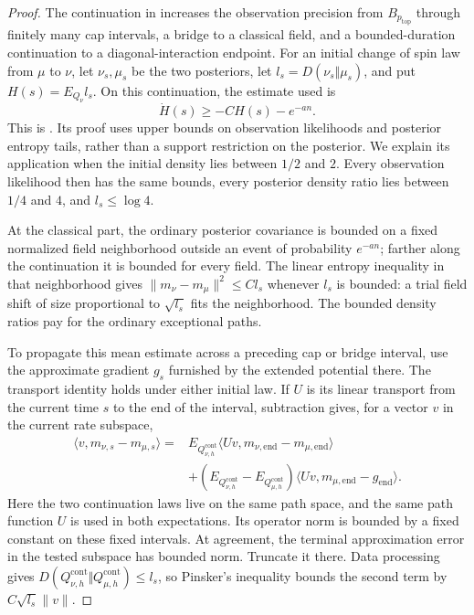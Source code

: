 \begin{proof}
The continuation in \cite[Section~19.4]{CM} increases the observation
precision from $B_{p_{\mathrm{top}}}$ through finitely many cap intervals,
a bridge to a classical field, and a bounded-duration continuation to
a diagonal-interaction endpoint. For an initial change of spin law from
$\mu$ to $\nu$, let $\nu_s,\mu_s$ be the two posteriors, let
$l_s=D(\nu_s\Vert\mu_s)$, and put
$H(s)=E_{Q_\nu}l_s$. On this continuation, the estimate used is
\begin{equation}\label{eq:variance-entropy-ode}
 \dot H(s)\ge-CH(s)-e^{-a n}.
\end{equation}
This is \cite[Equation~(19.17)]{CM}. Its proof uses upper bounds on
observation likelihoods and posterior entropy tails, rather than a
support restriction on the posterior. We explain its application when
the initial density lies between $1/2$ and $2$. Every observation likelihood
then has the same bounds, every posterior density ratio lies between
$1/4$ and $4$, and $l_s\le\log4$.

At the classical part, the ordinary posterior covariance is bounded on
a fixed normalized field neighborhood outside an event of probability
$e^{-an}$; farther along the continuation it is bounded for every field.
The linear entropy inequality in that neighborhood gives
$\|m_\nu-m_\mu\|^2\le Cl_s$ whenever $l_s$ is bounded: a trial field
shift of size proportional to $\sqrt{l_s}$ fits the neighborhood.
The bounded density ratios pay for the ordinary exceptional paths.

To propagate this mean estimate across a preceding cap or bridge
interval, use the approximate gradient $g_s$ furnished by the extended
potential there. The transport identity
\cite[Lemma~18.3]{CM} holds under either initial law. If $U$ is its
linear transport from the current time $s$ to the end of the interval,
subtraction gives, for a vector $v$ in the current rate subspace,
\begin{align*}
 \langle v,m_{\nu,s}-m_{\mu,s}\rangle
 ={}&E_{Q_{\nu,h}^{\mathrm{cont}}}
       \langle Uv,m_{\nu,\mathrm{end}}-m_{\mu,\mathrm{end}}\rangle\\
 &+(E_{Q_{\nu,h}^{\mathrm{cont}}}
       -E_{Q_{\mu,h}^{\mathrm{cont}}})
       \langle Uv,m_{\mu,\mathrm{end}}-g_{\mathrm{end}}\rangle.
\end{align*}
Here the two continuation laws live on the same path space, and the same
path function $U$ is used in both expectations. Its operator norm is
bounded by a fixed constant on these fixed intervals. At agreement,
the terminal approximation error in the tested subspace has bounded
norm. Truncate it there. Data processing gives
$D(Q_{\nu,h}^{\mathrm{cont}}\Vert Q_{\mu,h}^{\mathrm{cont}})\le l_s$,
so Pinsker's inequality bounds the second term by
$C\sqrt{l_s}\|v\|$.


\end{proof}
